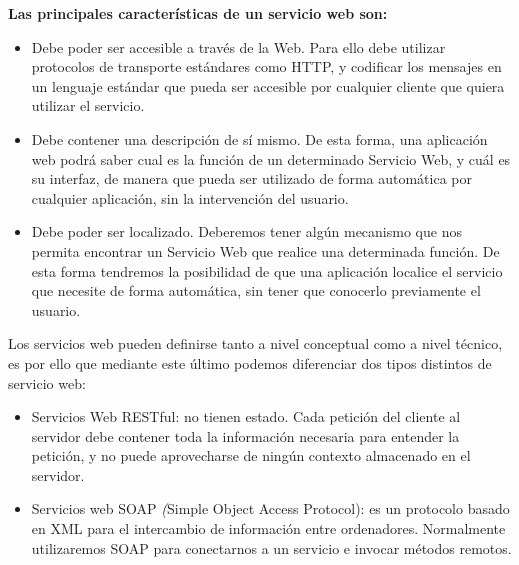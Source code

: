 \textbf{Las principales características de un servicio web son:}


\begin{itemize}
\item Debe poder ser accesible a través de la Web. Para ello debe utilizar protocolos de transporte estándares como HTTP, y codificar los mensajes en un lenguaje estándar que pueda ser accesible por cualquier cliente que quiera utilizar el servicio. 

\item Debe contener una descripción de sí mismo. De esta forma, una aplicación web podrá saber cual es la función de un determinado Servicio Web, y cuál es su interfaz, de manera que pueda ser utilizado de forma automática por cualquier aplicación, sin la intervención del usuario.
\item Debe poder ser localizado. Deberemos tener algún mecanismo que nos permita encontrar un Servicio Web que realice una determinada función. De esta forma tendremos la posibilidad de que una aplicación localice el servicio que necesite de forma automática, sin tener que conocerlo previamente el usuario.
\end{itemize}


Los servicios web pueden definirse tanto a nivel conceptual como a nivel técnico, es por ello que mediante este último podemos diferenciar dos tipos distintos de servicio web:
\begin{itemize}
	\item Servicios Web RESTful: no tienen estado. Cada petición del cliente al servidor debe contener toda la información necesaria para entender la petición, y no puede aprovecharse de ningún contexto almacenado en el servidor.
	\item Servicios web SOAP  \textit({Simple Object Access Protocol}): es un protocolo basado en XML para el intercambio de información entre ordenadores. Normalmente utilizaremos SOAP para conectarnos a un servicio e invocar métodos remotos.
\end{itemize}

